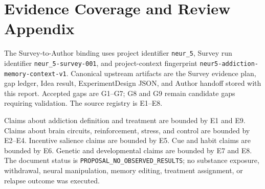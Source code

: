 \documentclass[conference]{IEEEtran}
\begin{document}
\section{Evidence Coverage and Review Appendix}
The Survey-to-Author binding uses project identifier \texttt{neur\_5}, Survey run identifier \texttt{neur\_5-survey-001}, and project-context fingerprint \texttt{neur5-addiction-memory-context-v1}. Canonical upstream artifacts are the Survey evidence plan, gap ledger, Idea result, ExperimentDesign JSON, and Author handoff stored with this report. Accepted gaps are G1--G7; G8 and G9 remain candidate gaps requiring validation. The source registry is E1--E8.

Claims about addiction definition and treatment are bounded by E1 and E9. Claims about brain circuits, reinforcement, stress, and control are bounded by E2--E4. Incentive salience claims are bounded by E5. Cue and habit claims are bounded by E6. Genetic and developmental claims are bounded by E7 and E8. The document status is \texttt{PROPOSAL\_NO\_OBSERVED\_RESULTS}; no substance exposure, withdrawal, neural manipulation, memory editing, treatment assignment, or relapse outcome was executed.
\end{document}
